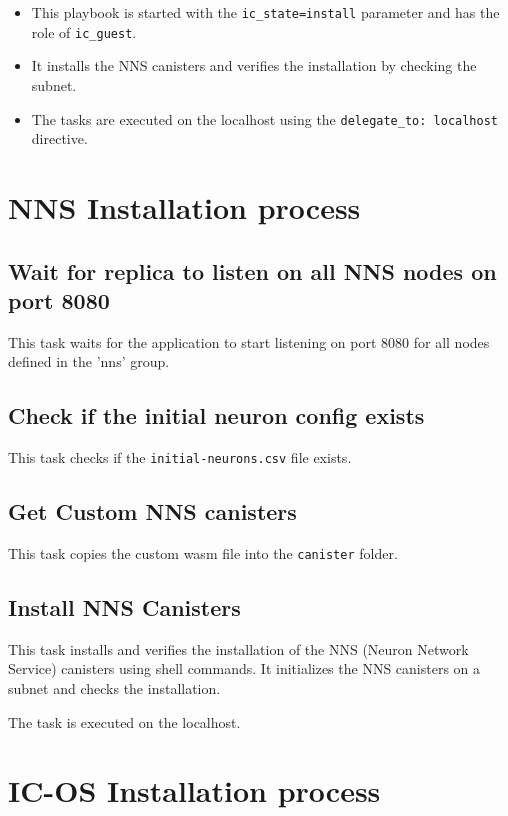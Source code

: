 \begin{itemize}
    \item This playbook is started with the \texttt{ic\_state=install} parameter and has the role of \texttt{ic\_guest}.
    \item It installs the NNS canisters and verifies the installation by checking the subnet.
    \item The tasks are executed on the localhost using the \texttt{delegate\_to: localhost} directive.
\end{itemize}

\section{NNS Installation process}

\subsection{Wait for replica to listen on all NNS nodes on port 8080}

This task waits for the application to start listening on port 8080 for all nodes defined in the 'nns' group.

\subsection{Check if the initial neuron config exists}

This task checks if the \texttt{initial-neurons.csv} file exists.

\subsection{Get Custom NNS canisters}

This task copies the custom wasm file into the \texttt{canister} folder.

\subsection{Install NNS Canisters}

This task installs and verifies the installation of the NNS (Neuron Network Service) canisters using shell commands. It 
initializes the NNS canisters on a subnet and checks the installation.

The task is executed on the localhost.

\section{IC-OS Installation process}

